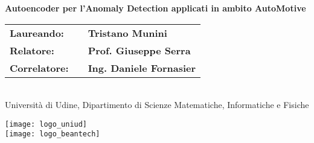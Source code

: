 \documentclass[a0,portrait]{a0poster}
\begin{document}
\begin{minipage}[cr]{0.7\linewidth}
\veryHuge \color{NavyBlue} \textbf{Autoencoder per l'Anomaly Detection applicati in ambito AutoMotive} \color{Black}\\ %
[.9cm]
\begin{tabular}{lll}
\huge \textbf{Laureando:}   && \huge \textbf{Tristano Munini}\\
\huge \textbf{Relatore:}    && \huge \textbf{Prof. Giuseppe Serra}\\
\huge \textbf{Correlatore:} && \huge \textbf{Ing. Daniele Fornasier}
\end{tabular} \\
[.5cm]

\huge Università di Udine, Dipartimento di Scienze Matematiche, Informatiche e Fisiche\\[0.1cm] %


\end{minipage}
\begin{minipage}[tr]{0.3\linewidth}
  \centering\texttt{[image: logo\_uniud]}\\
  [1cm]
  \centering\texttt{[image: logo\_beantech]}
\end{minipage}

\vspace{1cm} %

\end{document}

